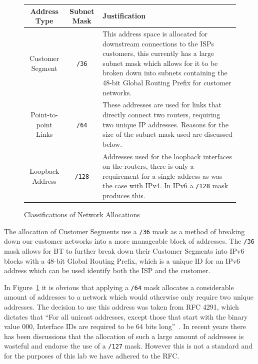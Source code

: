 \begin{figure}[!ht]
    \caption{Classifications of Network Allocations}
    \label{figure:network-alloc-3}
    \centering
    \begin{tabular}{|c|c|p{5.5cm}|}

        \hline \textbf{Address Type} & \textbf{Subnet Mask} & \textbf{Justification} \\

        \hline
        Customer Segment & \texttt{/36} & This address space is allocated for
        downstream connections to the ISPs customers, this currently has a large subnet
        mask which allows for it to be broken down into subnets containing the 48-bit
        Global Routing Prefix for customer networks.\\

        \hline
        Point-to-point Links & \texttt{/64} & These addresses
        are used for links that directly connect two routers, requiring two unique IP
        addresses. Reasons for the size of the subnet mask used are discussed below.\\

        \hline
        Loopback Address & \texttt{/128} & Addresses used for the loopback
        interfaces on the routers, there is only a requirement for a single address as
        was the case with IPv4. In IPv6 a \texttt{/128} mask produces this.\\

        \hline
    \end{tabular}
\end{figure}

The allocation of Customer Segments use a \texttt{/36} mask as a method of
breaking down our customer networks into a more manageable block of addresses.
The \texttt{/36} mask allows for BT to further break down their Customer
Segments into IPv6 blocks with a 48-bit Global Routing Prefix, which is a
unique ID for an IPv6 address which can be used identify both the ISP and the
customer.

In Figure~\ref{figure:network-alloc-3} it is obvious that applying a
\texttt{/64} mask allocates a considerable amount of addresses to a network
which would otherwise only require two unique addresses. The decision to use
this address was taken from RFC 4291, which dictates that ``For all unicast
addresses, except those that start with the binary value 000, Interface IDs are
required to be 64 bits long''~\cite{rfc4291}. In recent years there has been
discussions that the allocation of such a large amount of addresses is wasteful
and endorse the use of a \texttt{/127} mask. However this is not a standard and
for the purposes of this lab we have adhered to the RFC.
